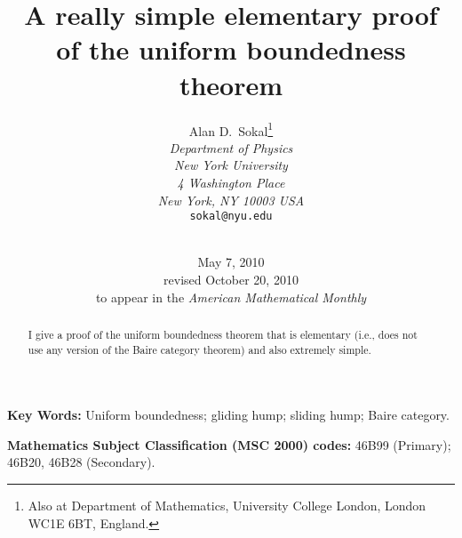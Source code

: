 \documentclass[12pt]{article}
\begin{document}
\title{A really simple elementary proof \\
       of the uniform boundedness theorem}

\author{
     {\small Alan D.~Sokal\thanks{Also at Department of Mathematics,
           University College London, London WC1E 6BT, England.}}  \\[-2mm]
     {\small\it Department of Physics}       \\[-2mm]
     {\small\it New York University}         \\[-2mm]
     {\small\it 4 Washington Place}          \\[-2mm]
     {\small\it New York, NY 10003 USA}      \\[-2mm]
     {\small\tt sokal@nyu.edu}               \\[-2mm]
     {\protect\makebox[5in]{\quad}}  %
     \\
}

\date{May 7, 2010 \\[3mm]
      revised October 20, 2010 \\[1mm]
      to appear in the {\em American Mathematical Monthly}}

\maketitle
\thispagestyle{empty}   %
\begin{abstract}
I give a proof of the uniform boundedness theorem that is elementary
(i.e., does not use any version of the Baire category theorem)
and also extremely simple.
\end{abstract}

\bigskip
\noindent
{\bf Key Words:}  Uniform boundedness;  gliding hump;  sliding hump;
Baire category.

\bigskip
\noindent
{\bf Mathematics Subject Classification (MSC 2000) codes:}
46B99 (Primary); 46B20, 46B28 (Secondary).

\clearpage



 \usepackage{./extract}
\newtheorem{thm}{Theorem}
\end{document}
